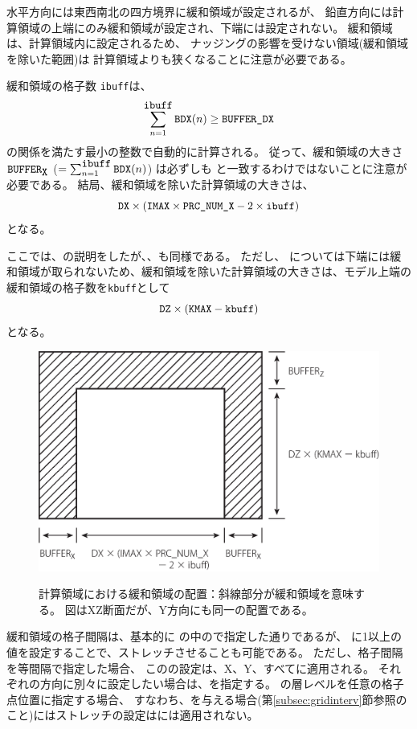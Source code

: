 %
水平方向には東西南北の四方境界に緩和領域が設定されるが、
鉛直方向には計算領域の上端にのみ緩和領域が設定され、下端には設定されない。
緩和領域は、計算領域内に設定されるため、
ナッジングの影響を受けない領域(緩和領域を除いた範囲)は
計算領域よりも狭くなることに注意が必要である。

緩和領域の格子数 \verb|ibuff|は、
\[
\sum_{n=1}^{\verb|ibuff|} \verb|BDX|(n) \ge \nmitemeq{BUFFER_DX} \nonumber
\]
の関係を満たす最小の整数で自動的に計算される。
従って、緩和領域の大きさ $\verb|BUFFER|_{\verb|X|}$ ($= \sum_{n=1}^{\verb|ibuff|} \verb|BDX|(n)$)
は必ずしも  と一致するわけではないことに注意が必要である。
結局、緩和領域を除いた計算領域の大きさは、
\[
\nmitemeq{DX} \times ( \nmitemeq{IMAX} \times \nmitemeq{PRC_NUM_X} - 2 \times \verb|ibuff| )
\]
となる。

ここでは、{\XDIR}の説明をしたが、{\YDIR}、{\ZDIR}も同様である。
ただし、{\ZDIR} については下端には緩和領域が取られないため、緩和領域を除いた計算領域の大きさは、モデル上端の緩和領域の格子数を\verb|kbuff|として
\[
\nmitemeq{DZ} \times ( \nmitemeq{KMAX} - \verb|kbuff| )
\]
となる。


\begin{figure}[t]
\begin{center}
  \includegraphics[width=0.8\hsize]{./figure/buffer_xz.eps}\\
  \caption{計算領域における緩和領域の配置：斜線部分が緩和領域を意味する。
  図はXZ断面だが、Y方向にも同一の配置である。}
  \label{fig:buff_xz}
\end{center}
\end{figure}



緩和領域の格子間隔は、基本的に
の中ので指定した通りであるが、
に1以上の値を設定することで、ストレッチさせることも可能である。
ただし、格子間隔を等間隔で指定した場合、
このの設定は、X、Y、{\ZDIR}すべてに適用される。
それぞれの方向に別々に設定したい場合は、を指定する。
{\ZDIR}の層レベルを任意の格子点位置に指定する場合、
すなわち、を与える場合(第\ref{subsec:gridinterv}節参照のこと)にはストレッチの設定は{\ZDIR}には適用されない。

